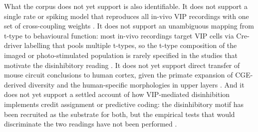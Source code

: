 \documentclass[11pt]{article}
\begin{document}
What the corpus does not yet support is also identifiable. It does not support a single rate or spiking model that reproduces all in-vivo VIP recordings with one set of cross-coupling weights \citep{Hertag2019, Garciadelmolino2017, Veit2023, Bos2025, Reimann2026}. It does not support an unambiguous mapping from t-type to behavioural function: most in-vivo recordings target VIP cells via Cre-driver labelling that pools multiple t-types, so the t-type composition of the imaged or photo-stimulated population is rarely specified in the studies that motivate the disinhibitory reading \citep{Pi2013, Fu2014, Pakan2016, Dipoppa2018, Pronneke2015, Schneidermizell2025}. It does not yet support direct transfer of mouse circuit conclusions to human cortex, given the primate expansion of CGE-derived diversity and the human-specific morphologies in upper layers \citep{Hodge2019, Boldog2018, Chartrand2023, Bakken2021a, Krienen2020}. And it does not yet support a settled account of how VIP-mediated disinhibition implements credit assignment or predictive coding: the disinhibitory motif has been recruited as the substrate for both, but the empirical tests that would discriminate the two readings have not been performed \citep{Hertag2019, Hertag2020, Hertag2021, Wagatsuma2023, Lee2025, Rossbroich2025, Nemati2025a, Nemati2025b, Sabri2024, Shipp2016}.
\end{document}
